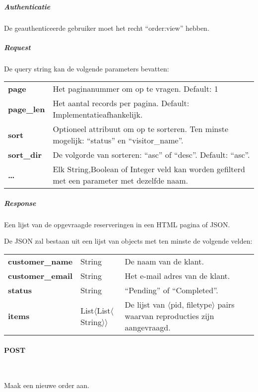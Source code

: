 \documentclass[a4paper,titlepage]{report}
\makeatletter
\def\namedlabel#1#2{
  \label{#1}
  \begingroup
   \def\@currentlabel{#2}%
   \label{#1:name}\endgroup
}
\makeatother
\begin{document}
          \subparagraph{Authenticatie}
            De geauthenticeerde gebruiker moet het recht ``order:view''
            hebben.

          \subparagraph{Request}
            De query string kan de volgende parameters bevatten:\\

            \begin{tabular}{l p{13cm}}
              \textbf{page} & Het paginanummer om op te vragen. Default: 1\\
              \textbf{page\_len} & Het aantal records per pagina. Default:
              Implementatieafhankelijk. \\
              \textbf{sort} & Optioneel attribuut om op te sorteren. Ten
              minste mogelijk: ``status'' en ``visitor\_name''. \\
              \textbf{sort\_dir} & De volgorde van sorteren: ``asc'' of
              ``desc''. Default: ``asc''.\\
              \textbf{\ldots} & Elk String,Boolean of Integer veld kan worden
                gefilterd met een parameter met dezelfde naam.
            \end{tabular}

          \subparagraph{Response}
            Een lijst van de opgevraagde reserveringen in een HTML pagina of JSON.

            De JSON zal bestaan uit een lijst van objects met ten minste de
            volgende velden:\\

            \begin{tabular}{ l l p{8cm} }
              \textbf{customer\_name} & String & De naam van de klant. \\
              \textbf{customer\_email} & String & Het e-mail adres van de
              klant. \\
              \textbf{status} & String & ``Pending'' of ``Completed''. \\
              \textbf{items} & List$\langle$List$\langle$String$\rangle\rangle$ & De lijst van
              $\langle$pid, filetype$\rangle$ pairs waarvan reproducties zijn aangevraagd.\\
            \end{tabular}

        \paragraph{POST}\hfill\\
          \namedlabel{api:order-list:post}{POST /order/}
          Maak een nieuwe order aan.
\end{document}
